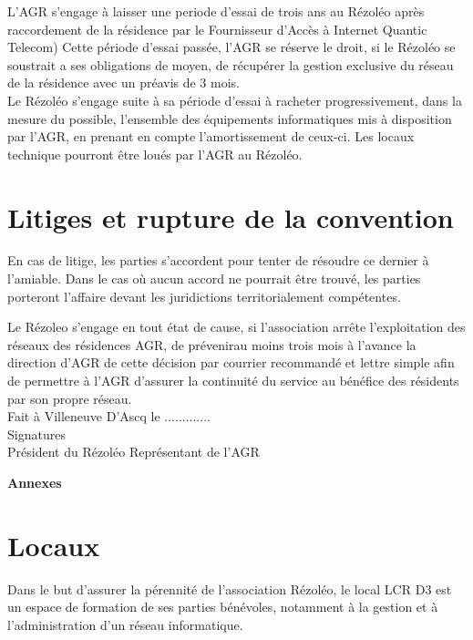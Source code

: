 \documentclass[12pt]{constitution}
\begin{document}
    L'AGR s'engage à laisser une periode d'essai de trois ans au Rézoléo après raccordement de la résidence par le Fournisseur d'Accès à Internet Quantic Telecom) Cette période d'essai passée, l'AGR se réserve le droit, si le Rézoléo se soustrait a ses obligations de moyen, de récupérer la gestion exclusive du réseau de la résidence avec un préavis de 3 mois.\\

    Le Rézoléo s'engage suite à sa période d'essai à racheter progressivement, dans la mesure du possible, l'ensemble des équipements informatiques mis à disposition par l'AGR, en prenant en compte l'amortissement de ceux-ci. Les locaux technique pourront être loués par l'AGR au Rézoléo.\\


\section{Litiges et rupture de la convention}

    En cas de litige, les parties s'accordent pour tenter de résoudre ce dernier à l'amiable. Dans le cas où aucun accord ne pourrait être trouvé, les parties porteront l'affaire devant les juridictions territorialement compétentes.


    Le Rézoleo s'engage en tout état de cause, si l'association arrête l'exploitation des réseaux des résidences AGR, de prévenirau moins trois mois à l'avance la direction d'AGR de cette décision par courrier recommandé et lettre simple afin de permettre à l'AGR d'assurer la continuité du service au bénéfice des résidents par son propre réseau.\\

Fait à Villeneuve D'Ascq le .............\\


\noindent Signatures \\
Président du Rézoléo \hfill Représentant de l'AGR

\newpage

\begin{center}
\textbf{\large{Annexes}}
\end{center}
\noindent
\section{Locaux}

    Dans le but d'assurer la pérennité de l'association Rézoléo, le local LCR D3 est un espace de formation de ses parties bénévoles, notamment à la gestion et à l'administration d'un réseau informatique.\\
\end{document}
